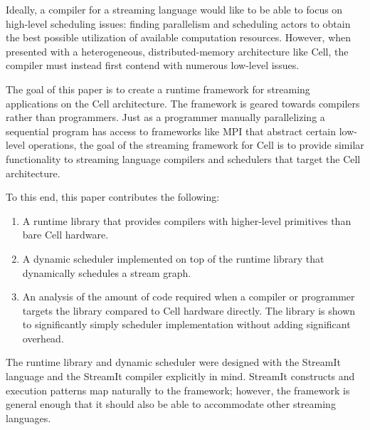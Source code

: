 Ideally, a compiler for a streaming language would like to be able to focus on high-level scheduling issues: finding parallelism and scheduling actors to obtain the best possible utilization of available computation resources. However, when presented with a heterogeneous, distributed-memory architecture like Cell, the compiler must instead first contend with numerous low-level issues.

The goal of this paper is to create a runtime framework for streaming applications on the Cell architecture. The framework is geared towards compilers rather than programmers. Just as a programmer manually parallelizing a sequential program has access to frameworks like MPI that abstract certain low-level operations, the goal of the streaming framework for Cell is to provide similar functionality to streaming language compilers and schedulers that target the Cell architecture.

To this end, this paper contributes the following:
\begin{enumerate}
\item A runtime library that provides compilers with higher-level primitives than bare Cell hardware.
\item A dynamic scheduler implemented on top of the runtime library that dynamically schedules a stream graph.
\item An analysis of the amount of code required when a compiler or programmer targets the library compared to Cell hardware directly. The library is shown to significantly simply scheduler implementation without adding significant overhead.
\end{enumerate}

The runtime library and dynamic scheduler were designed with the StreamIt language and the StreamIt compiler explicitly in mind. StreamIt constructs and execution patterns map naturally to the framework; however, the framework is general enough that it should also be able to accommodate other streaming languages.

